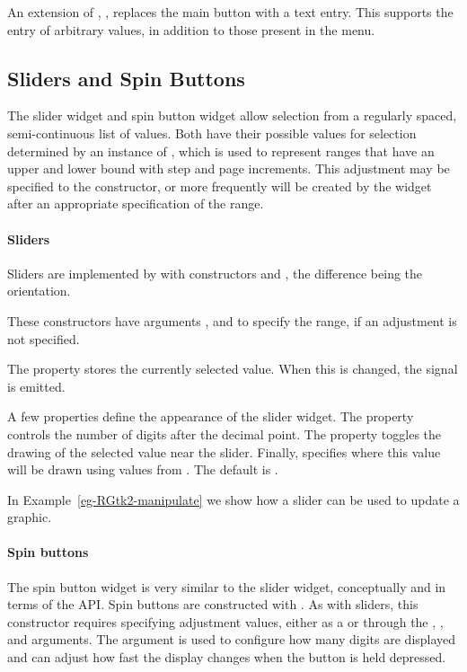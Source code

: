 An extension of , ,
replaces the main button with a text entry. This supports the entry of
arbitrary values, in addition to those present in the menu.



\subsection{Sliders and Spin Buttons}
\label{sec:RGtk2:sliders-spinbuttons}

The slider widget and spin button widget allow selection from a
regularly spaced, semi-continuous list of values. Both have their
possible values for selection determined by an instance of
, which is used to represent ranges that have an
upper and lower bound with step and page increments. This adjustment
may be specified to the constructor, or more frequently will be
created by the widget after an appropriate specification of the range.

\paragraph{Sliders}
Sliders are implemented by  with constructors
 and , the difference
being the orientation. 

These constructors have arguments ,
 and  to specify
the range, if an adjustment is not specified. 

The  property stores the currently selected value. When
this is changed, the  signal is emitted. 

A few properties define the appearance of the slider widget.  The
 property controls the number of digits after the decimal
point.  The property  toggles the drawing of the
selected value near the slider. Finally, 
specifies where this value will be drawn using
values from . The default is .

In Example~\ref{eg-RGtk2-manipulate} we show how a slider can be used
to update a graphic.

\paragraph{Spin buttons}
The spin button widget is very similar to the slider widget,
conceptually and in terms of the \GTK\/ API. Spin buttons are
constructed with . As with sliders, this
constructor requires specifying adjustment values, either as a
 or through the ,
, and  arguments.
The argument  is used to configure how many
digits are displayed and  can
adjust how fast the display changes when the button is held depressed.

